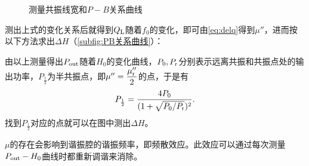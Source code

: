 \begin{enumerate}
\begin{figure}[htbp]
				\caption{测量共振线宽和$P-B$关系曲线}
			\end{figure}
			测出上式的变化关系后就得到$Q_{\rm L}$随着$f_0$的变化，即可由\cref{eq:delq}得到$\mu''$，进而按以下方法求出$\Delta H$（\cref{subfig:PB关系曲线}）：
			\par 由以上测量得出$P_{\rm out}$随着$H_0$的变化曲线，$P_0,P_{\rm r}$分别表示远离共振和共振点处的输出功率，$P_{\frac{1}{2}}$为半共振点，即$\mu''=\dfrac{\mu''_{\rm r}}{2}$的点，于是有
			\begin{equation}
				P_{\frac{1}{2}}=\dfrac{4P_0}{(1+\sqrt{P_0/P_{\rm r}})^2}.\label{eq:p}
			\end{equation}
			找到$P_{\frac{1}{2}}$对应的点就可以在图中测出$\Delta H$。
			\par $\mu$的存在会影响到谐振腔的谐振频率，即频散效应。此效应可以通过每次测量$P_{\rm out}-H_0$曲线时都重新调谐来消除。
		\end{enumerate}
